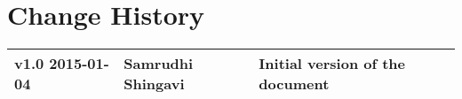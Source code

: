 \chapter*{Change History}
\thispagestyle{empty}
\begin{table}[h]
\begin{tabular}{lll}
\toprule
v1.0 2015-01-04 & Samrudhi Shingavi & Initial version of the document \\
\midrule
\end{tabular}
\end{table}